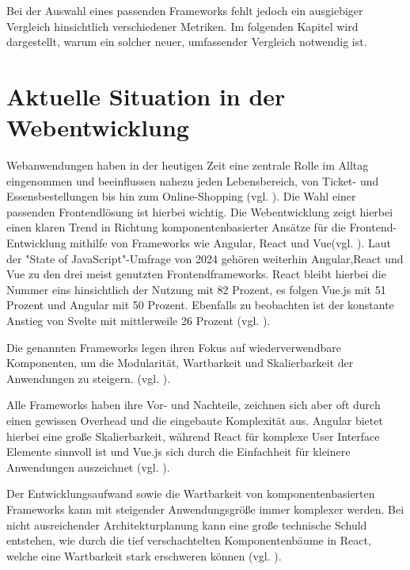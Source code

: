 \documentclass[oneside]{ausarbeitung}
\begin{document}
Bei der Auswahl eines passenden Frameworks fehlt jedoch ein ausgiebiger Vergleich hinsichtlich verschiedener Metriken. Im folgenden Kapitel wird dargestellt, warum ein solcher neuer, umfassender Vergleich notwendig ist.

\section{Aktuelle Situation in der Webentwicklung}

Webanwendungen haben in der heutigen Zeit eine zentrale Rolle im Alltag eingenommen und beeinflussen nahezu jeden Lebensbereich, von Ticket- und Essensbestellungen bis hin zum Online-Shopping (vgl. \autocite[S. 298]{spa-frameworks-2024}). Die Wahl einer passenden Frontendlösung ist hierbei wichtig. 
Die Webentwicklung zeigt hierbei einen klaren Trend in Richtung komponentenbasierter Ansätze für die Frontend-Entwicklung mithilfe von Frameworks wie Angular, React und Vue(vgl. \parencite[S. 43]{js-framework-comparison}). Laut der "State of JavaScript"-Umfrage von 2024 gehören weiterhin Angular,React und Vue zu den drei meist genutzten Frontendframeworks. React bleibt hierbei die Nummer eins hinsichtlich der Nutzung mit 82 Prozent, es folgen Vue.js mit 51 Prozent und Angular mit 50 Prozent. Ebenfalls zu beobachten ist der konstante Anstieg von Svelte mit mittlerweile 26 Prozent (vgl. \parencite {stateofjs2024}).

Die genannten Frameworks legen ihren Fokus auf wiederverwendbare Komponenten, um die Modularität, Wartbarkeit und Skalierbarkeit der Anwendungen zu steigern. (vgl. \autocite [S. 302,303]{spa-frameworks-2024}). 

Alle Frameworks haben ihre Vor- und Nachteile, zeichnen sich aber oft durch einen gewissen Overhead und die eingebaute Komplexität aus. Angular bietet hierbei eine große Skalierbarkeit, während React für komplexe User Interface Elemente sinnvoll ist und Vue.js sich durch die Einfachheit für kleinere Anwendungen auszeichnet (vgl. \parencite[S. 1070]{frontend_frameworks_comparison}). 

Der Entwicklungsaufwand sowie die Wartbarkeit von komponentenbasierten Frameworks kann mit steigender Anwendungsgröße immer komplexer werden. Bei nicht ausreichender Architekturplanung kann eine große technische Schuld entstehen, wie durch die tief verschachtelten Komponentenbäume in React, welche eine Wartbarkeit stark erschweren können (vgl. \parencite[S. 28,29]{comparison-frameworks-scalable-apps}).
\end{document}
